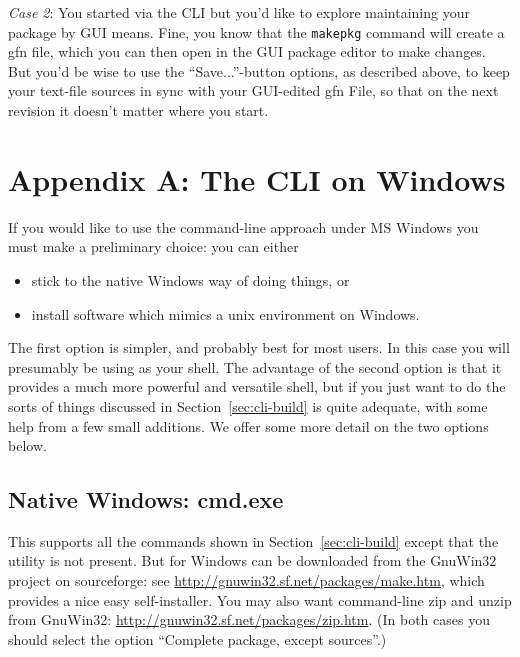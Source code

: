 \documentclass[oneside]{book}
\begin{document}
\textit{Case 2}: You started via the CLI but you'd like to explore
maintaining your package by GUI means. Fine, you know that the
\texttt{makepkg} command will create a \textsf{gfn} file, which you can
then open in the GUI package editor to make changes. But you'd be wise
to use the ``\textsf{Save...}''-button options, as described above, to
keep your text-file sources in sync with your GUI-edited \textsf{gfn}
File, so that on the next revision it doesn't matter where you start.

\clearpage

\section*{Appendix A: The CLI on Windows}

If you would like to use the command-line approach under MS Windows
you must make a preliminary choice: you can either
\begin{itemize}
\item stick to the native Windows way of doing things, or
\item install software which mimics a unix environment on Windows.
\end{itemize}

The first option is simpler, and probably best for most users. In this
case you will presumably be using  as your shell. The
advantage of the second option is that it provides a much more
powerful and versatile shell, but if you just want to do the sorts of
things discussed in Section~\ref{sec:cli-build}  is quite
adequate, with some help from a few small additions.  We offer some
more detail on the two options below.

\subsection*{Native Windows: cmd.exe}
\label{sec:cmd.exe}

This supports all the commands shown in Section~\ref{sec:cli-build}
except that the  utility is not present. But  for
Windows can be downloaded from the \textsf{GnuWin32} project on
sourceforge: see \url{http://gnuwin32.sf.net/packages/make.htm},
which provides a nice easy self-installer. You may also want
command-line \textsf{zip} and \textsf{unzip} from \textsf{GnuWin32}:
\url{http://gnuwin32.sf.net/packages/zip.htm}. (In both cases you
should select the option ``Complete package, except sources''.)
\end{document}
